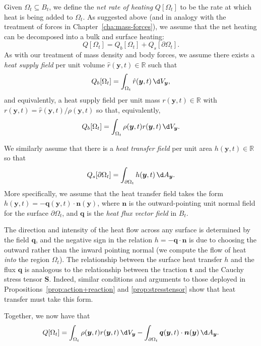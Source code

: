\documentclass[
  letterpaper,
  DIV=11,
  numbers=noendperiod]{scrreprt}
\theoremstyle{plain}
\theoremstyle{remark}
\begin{document}
Given \(\Omega_t\subseteq B_t\), we define the \emph{net rate of
heating} \(Q[\Omega_t]\) to be the rate at which heat is being added to
\(\Omega_t\). As suggested above (and in analogy with the treatment of
forces in Chapter~\hyperref[cha:mass-forces]{{[}cha:mass-forces{]}}), we
assume that the net heating can be decomposed into a bulk and surface
heating: \[Q[\Omega_t] = Q_b[\Omega_t]+Q_s[\partial\Omega_t].\] As with
our treatment of mass density and body forces, we assume there exists a
\emph{heat supply field} per unit volume
\(\hat{r}({\boldsymbol{y}},t)\in{\mathbb{R}}\) such that
\[Q_b[\Omega_t] = \int_{\Omega_t}\hat{r}({\boldsymbol{y}},t){\,\d V_{{\boldsymbol{y}}}},\]
and equivalently, a heat supply field per unit mass
\(r({\boldsymbol{y}},t)\in{\mathbb{R}}\) with
\(r({\boldsymbol{y}},t) = \hat{r}({\boldsymbol{y}},t)/\rho({\boldsymbol{y}},t)\)
so that, equivalently,
\[Q_b[\Omega_t] = \int_{\Omega_t}\rho({\boldsymbol{y}},t)r({\boldsymbol{y}},t){\,\d V_{{\boldsymbol{y}}}}.\]

We similarly assume that there is a \emph{heat transfer field} per unit
area \(h({\boldsymbol{y}},t)\in{\mathbb{R}}\) so that
\[Q_s[\partial\Omega_t] = \int_{\partial \Omega_t} h({\boldsymbol{y}},t){\,\d A_{{\boldsymbol{y}}}}.\]
More specifically, we assume that the heat transfer field takes the form
\(h({\boldsymbol{y}},t) = -{\boldsymbol{q}}({\boldsymbol{y}},t)\cdot{\boldsymbol{n}}({\boldsymbol{y}})\),
where \({\boldsymbol{n}}\) is the outward-pointing unit normal field for
the surface \(\partial\Omega_t\), and \({\boldsymbol{q}}\) is the
\emph{heat flux vector field} in \(B_t\).

The direction and intensity of the heat flow across any surface is
determined by the field \({\boldsymbol{q}}\), and the negative sign in
the relation \(h=-{\boldsymbol{q}}\cdot{\boldsymbol{n}}\) is due to
choosing the outward rather than the inward pointing normal (we compute
the flow of heat \emph{into} the region \(\Omega_t\)). The relationship
between the surface heat transfer \(h\) and the flux
\({\boldsymbol{q}}\) is analogous to the relationship between the
traction \({\boldsymbol{t}}\) and the Cauchy stress tensor
\({\boldsymbol{S}}\). Indeed, similar conditions and arguments to those
deployed in
Propositions~\hyperref[prop:action+reaction]{{[}prop:action+reaction{]}}
and \hyperref[prop:stresstensor]{{[}prop:stresstensor{]}} show that heat
transfer must take this form.

Together, we now have that
\[Q[\Omega_t] = \int_{\Omega_t}\rho({\boldsymbol{y}},t)r({\boldsymbol{y}},t){\,\d V_{{\boldsymbol{y}}}}-\int_{\partial \Omega_t}{\boldsymbol{q}}({\boldsymbol{y}},t)\cdot{\boldsymbol{n}}({\boldsymbol{y}}){\,\d A_{{\boldsymbol{y}}}}.\]
\end{document}
